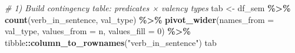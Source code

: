 \documentclass[
]{article}
\newenvironment{Shaded}{\begin{snugshade}}{\end{snugshade}}
\newcommand{\AttributeTok}[1]{\textcolor[rgb]{0.13,0.29,0.53}{#1}}
\newcommand{\CommentTok}[1]{\textcolor[rgb]{0.56,0.35,0.01}{\textit{#1}}}
\newcommand{\DecValTok}[1]{\textcolor[rgb]{0.00,0.00,0.81}{#1}}
\newcommand{\FunctionTok}[1]{\textcolor[rgb]{0.13,0.29,0.53}{\textbf{#1}}}
\newcommand{\NormalTok}[1]{#1}
\newcommand{\OtherTok}[1]{\textcolor[rgb]{0.56,0.35,0.01}{#1}}
\newcommand{\SpecialCharTok}[1]{\textcolor[rgb]{0.81,0.36,0.00}{\textbf{#1}}}
\newcommand{\StringTok}[1]{\textcolor[rgb]{0.31,0.60,0.02}{#1}}
\begin{document}
\begin{Shaded}
\begin{Highlighting}[]
\CommentTok{\# 1) Build contingency table: predicates × valency types}
\NormalTok{tab }\OtherTok{\textless{}{-}}\NormalTok{ df\_sem }\SpecialCharTok{\%\textgreater{}\%}
  \FunctionTok{count}\NormalTok{(verb\_in\_sentence, val\_type) }\SpecialCharTok{\%\textgreater{}\%}
  \FunctionTok{pivot\_wider}\NormalTok{(}\AttributeTok{names\_from =}\NormalTok{ val\_type, }\AttributeTok{values\_from =}\NormalTok{ n, }\AttributeTok{values\_fill =} \DecValTok{0}\NormalTok{) }\SpecialCharTok{\%\textgreater{}\%}
\NormalTok{  tibble}\SpecialCharTok{::}\FunctionTok{column\_to\_rownames}\NormalTok{(}\StringTok{"verb\_in\_sentence"}\NormalTok{)}
\NormalTok{tab}
\end{Highlighting}
\end{Shaded}
\end{document}
